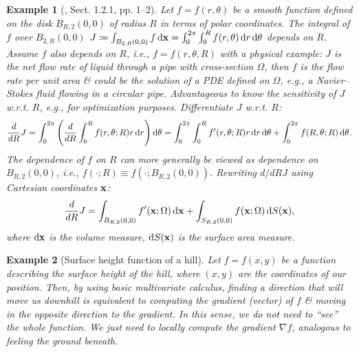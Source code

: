 \documentclass{article}
\newtheorem{example}{Example}
\begin{document}
\begin{example}[\cite{Walker2015}, Sect. 1.2.1, pp. 1--2]
	Let $f = f(r,\theta)$ be a smooth function defined on the disk $B_{R,2}(0,0)$ of radius $R$ in terms of polar coordinates. The integral of $f$ over $B_{2,R}(0,0)$ $J\coloneqq\int_{B_{2,R}(0,0)} f\,{\rm d}{\bf x} = \int_0^{2\pi}\int_0^R f(r,\theta)\,{\rm d}r\,{\rm d}\theta$ depends on $R$. Assume $f$ also depends on $R$, i.e., $f = f(r,\theta,R)$ with a physical example: $J$ is the \emph{net flow rate} of liquid through a pipe with cross-section $\Omega$, then $f$ is the flow rate per unit area \& could be the solution of a PDE defined on $\Omega$, e.g., a Navier--Stokes fluid flowing in a circular pipe. Advantageous to know the \emph{sensitivity} of $J$ w.r.t. $R$, e.g., for optimization purposes. Differentiate $J$ w.r.t. $R$:
	\begin{equation*}
		\frac{d}{dR}J = \int_0^{2\pi}\left(\frac{d}{dR}\int_0^R f(r,\theta;R)r\,{\rm d}r\right){\rm d}\theta = \int_0^{2\pi}\int_0^R f'(r,\theta;R)r\,{\rm d}r\,{\rm d}\theta + \int_0^{2\pi} f(R,\theta;R)\,{\rm d}\theta.
	\end{equation*}
	The dependence of $f$ on $R$ can more generally be viewed as dependence on $B_{R,2}(0,0)$, i.e., $f(\cdot;R)\equiv f(\cdot;B_{R,2}(0,0))$. Rewriting $d/dR J$ using Cartesian coordinates ${\bf x}$:
	\begin{equation}
		\frac{d}{dR}J = \int_{B_{R,2}(0,0)} f'({\bf x};\Omega)\,{\rm d}{\bf x} + \int_{S_{R,2}(0,0)} f({\bf x};\Omega)\,{\rm d}S({\bf x}),
	\end{equation}
	where ${\rm d}{\bf x}$ is the volume measure, ${\rm d}S({\bf x})$ is the surface area measure.
\end{example}

\begin{example}[Surface height function of a hill]
	Let $f = f(x,y)$ be a function describing the surface height of the hill, where $(x,y)$ are the coordinates of our position. Then, by using basic multivariate calculus, finding a direction that will move us downhill is equivalent to computing the gradient (vector) of $f$ \& moving in the opposite direction to the gradient. In this sense, we do not need to ``see'' the whole function. We just need to \emph{locally} compute the gradient $\nabla f$, analogous to feeling the ground beneath.
\end{example}
\end{document}

